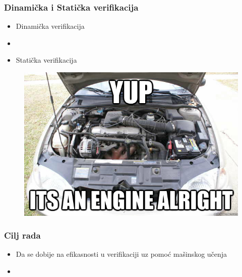 \documentclass[14pt]{beamer}
\begin{document}
\begin{frame}
\frametitle{Dinamička i Statička verifikacija}
\begin{itemize}
\item Dinamička verifikacija
\item[]
\item Statička verifikacija
\end{itemize}

\begin{figure}
\includegraphics[width=0.5\linewidth]{engine}
\end{figure}

\end{frame}

\begin{frame}
\frametitle{Cilj rada}

\begin{itemize}
\item Da se dobije na efikasnosti u verifikaciji uz pomoć mašinskog učenja
\item[]
\end{itemize}

\end{frame}
\end{document}
